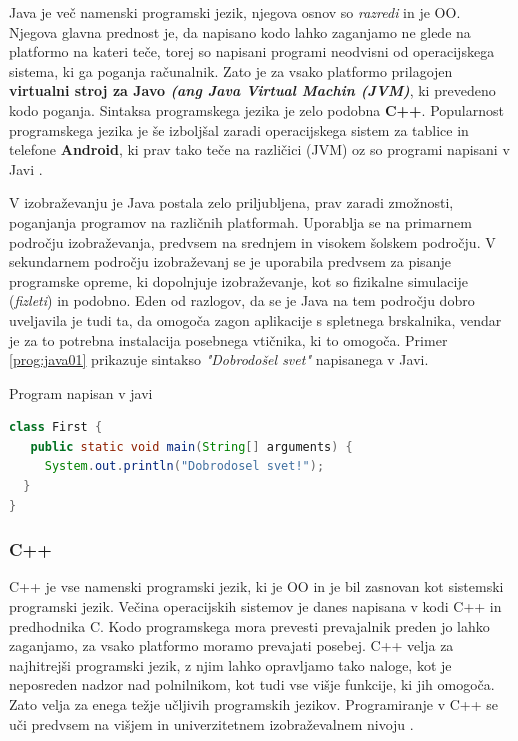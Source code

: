 Java je več namenski programski jezik, njegova osnov so \emph{razredi}
in je OO. Njegova glavna prednost je, da napisano kodo lahko zaganjamo
ne glede na platformo na kateri teče, torej so napisani programi
neodvisni od operacijskega sistema, ki ga poganja računalnik. Zato je
za vsako platformo prilagojen \textbf{virtualni stroj za Javo
  \emph{(ang Java Virtual Machin (JVM)}}, ki prevedeno kodo
poganja. Sintaksa programskega jezika je zelo podobna
\textbf{C++}. Popularnost programskega jezika je še izboljšal zaradi
operacijskega sistem za tablice in telefone \textbf{Android}, ki prav
tako teče na različici (JVM) oz so programi napisani v Javi
\cite{wiki:java}.

V izobraževanju je Java postala zelo priljubljena, prav zaradi
zmožnosti, poganjanja programov na različnih platformah. Uporablja se
na primarnem področju izobraževanja, predvsem na srednjem in visokem
šolskem področju. V sekundarnem področju izobraževanj se je uporabila
predvsem za pisanje programske opreme, ki dopolnjuje izobraževanje,
kot so fizikalne simulacije (\emph{fizleti}) in podobno. Eden od
razlogov, da se je Java na tem področju dobro uveljavila je tudi ta,
da omogoča zagon aplikacije s spletnega brskalnika, vendar je za to
potrebna instalacija posebnega vtičnika, ki to omogoča. Primer
\ref{prog:java01} prikazuje sintakso \emph{"Dobrodošel svet"}
napisanega v Javi.
\begin{examplebox}[label={prog:java01}]{Program napisan v javi}
\begin{lstlisting}[language=Java]
class First {
   public static void main(String[] arguments) {
     System.out.println("Dobrodosel svet!");
  }
}
\end{lstlisting}
\end{examplebox}


\subsubsection{C++}
\label{sec:pj_c++}

C++ je vse namenski programski jezik, ki je OO in je bil zasnovan kot
sistemski programski jezik. Večina operacijskih sistemov je danes
napisana v kodi C++ in predhodnika C. Kodo programskega mora prevesti
prevajalnik preden jo lahko zaganjamo, za vsako platformo moramo
prevajati posebej.  C++ velja za najhitrejši programski jezik, z njim
lahko opravljamo tako naloge, kot je neposreden nadzor nad
polnilnikom, kot tudi vse višje funkcije, ki jih omogoča. Zato velja
za enega težje učljivih programskih jezikov. Programiranje v C++ se
uči predvsem na višjem in univerzitetnem izobraževalnem nivoju \cite{wiki:cpp}.

